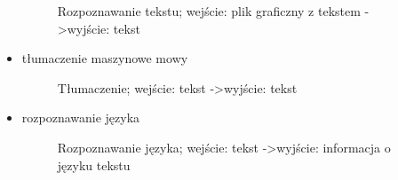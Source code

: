 \begin{itemize}
\begin{figure}[!h]
			\caption{Rozpoznawanie tekstu; wejście: plik graficzny z tekstem -\textgreater wyjście: tekst}\label{fig:hub_and_spoke}
		\end{figure}
	\item tłumaczenie maszynowe mowy
		\setlength\fboxsep{20pt}
		\setlength\fboxrule{1pt}
		\begin{figure}[!h]
			\centering
			\caption{Tłumaczenie; wejście: tekst -\textgreater wyjście: tekst}\label{fig:hub_and_spoke}
		\end{figure}
\newpage
	\item rozpoznawanie języka
		\setlength\fboxsep{20pt}
		\setlength\fboxrule{1pt}
		\begin{figure}[!h]
			\centering
			\caption{Rozpoznawanie języka; wejście: tekst -\textgreater wyjście: informacja o języku tekstu}\label{fig:hub_and_spoke}
		\end{figure}
\end{itemize} 

